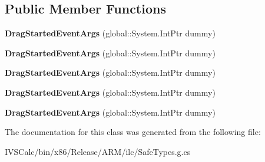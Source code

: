 \subsection*{Public Member Functions}
\begin{DoxyCompactItemize}
\item 
\mbox{\label{class_windows_1_1_u_i_1_1_xaml_1_1_controls_1_1_primitives_1_1_drag_started_event_args_aac047b88907a7dd959fa6914ac903e3b}} 
{\bfseries Drag\+Started\+Event\+Args} (global\+::\+System.\+Int\+Ptr dummy)
\item 
\mbox{\label{class_windows_1_1_u_i_1_1_xaml_1_1_controls_1_1_primitives_1_1_drag_started_event_args_aac047b88907a7dd959fa6914ac903e3b}} 
{\bfseries Drag\+Started\+Event\+Args} (global\+::\+System.\+Int\+Ptr dummy)
\item 
\mbox{\label{class_windows_1_1_u_i_1_1_xaml_1_1_controls_1_1_primitives_1_1_drag_started_event_args_aac047b88907a7dd959fa6914ac903e3b}} 
{\bfseries Drag\+Started\+Event\+Args} (global\+::\+System.\+Int\+Ptr dummy)
\item 
\mbox{\label{class_windows_1_1_u_i_1_1_xaml_1_1_controls_1_1_primitives_1_1_drag_started_event_args_aac047b88907a7dd959fa6914ac903e3b}} 
{\bfseries Drag\+Started\+Event\+Args} (global\+::\+System.\+Int\+Ptr dummy)
\item 
\mbox{\label{class_windows_1_1_u_i_1_1_xaml_1_1_controls_1_1_primitives_1_1_drag_started_event_args_aac047b88907a7dd959fa6914ac903e3b}} 
{\bfseries Drag\+Started\+Event\+Args} (global\+::\+System.\+Int\+Ptr dummy)
\end{DoxyCompactItemize}


The documentation for this class was generated from the following file\+:\begin{DoxyCompactItemize}
\item 
I\+V\+S\+Calc/bin/x86/\+Release/\+A\+R\+M/ilc/Safe\+Types.\+g.\+cs\end{DoxyCompactItemize}
